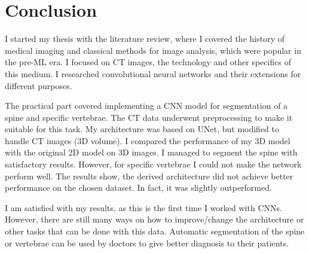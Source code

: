\chapter{Conclusion}
\label{ch:conclusion}
I started my thesis with the literature review, where I covered the history of medical imaging and classical methods for image analysis, which were popular in the pre-ML era. I focused on CT images, the technology and other specifics of this medium. I researched convolutional neural networks and their extensions for different purposes.

The practical part covered implementing a CNN model for segmentation of a spine and specific vertebrae. The CT data underwent preprocessing to make it suitable for this task. My architecture was based on UNet, but modified to handle CT images (3D volume). I compared the performance of my 3D model with the original 2D model on 3D images. I managed to segment the spine with satisfactory results. However, for specific vertebrae I could not make the network perform well. The results show, the derived architecture did not achieve better performance on the chosen dataset. In fact, it was slightly outperformed. 

I am satisfied with my results, as this is the first time I worked with CNNs. However, there are still many ways on how to improve/change the architecture or other tasks that can be done with this data. Automatic segmentation of the spine or vertebrae can be used by doctors to give better diagnosis to their patients.
